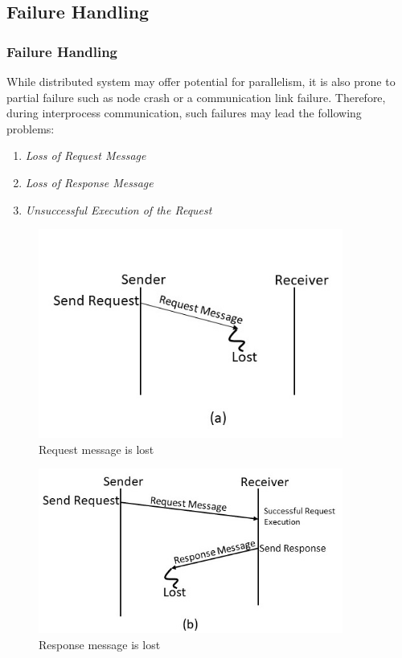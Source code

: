 \documentclass{beamer}
\begin{document}
\subsection{Failure Handling}
\begin{frame}[allowframebreaks]
	\frametitle{ Failure Handling}
	While distributed system may offer potential for parallelism, it is also prone to
	partial failure such as node crash or a communication link failure. Therefore, during
	interprocess communication, such failures may lead the following problems:
	\begin{enumerate}
		\item \textit{Loss of Request Message}
		\item \textit{Loss of Response Message}
		\item \textit{Unsuccessful Execution of the Request}
	\end{enumerate}	
	\vspace{2cm}
	\framebreak
	\begin{figure}
		\centering
		\includegraphics[width=10cm]{fig36(a).jpg}
		\caption{Request message is lost}
	\end{figure}
	\framebreak	
	\begin{figure}
		\centering
		\includegraphics[width=10cm]{fig36(b).jpg}
		\caption{Response message is lost}
	\end{figure}

\end{frame}
\end{document}
